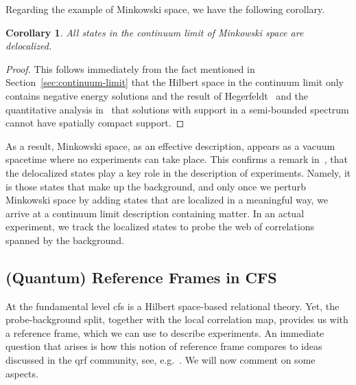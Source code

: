 \documentclass[reqno,11pt]{amsart}
\newtheorem{corollary}[definition]{Corollary}
\numberwithin{equation}{section}
\begin{document}
Regarding the example of Minkowski space, we have the following corollary. 
\begin{corollary}
      All states in the continuum limit of Minkowski space are delocalized. 
\end{corollary}
  
\begin{proof}
This follows immediately from the fact mentioned in Section~\ref{sec:continuum-limit} that the Hilbert space in the continuum limit only contains negative energy solutions and the result of Hegerfeldt~\cite{hegerfeldt1974remark} and the quantitative analysis in~\cite{finster2023incompatibility} that solutions with support in a semi-bounded spectrum cannot have spatially compact support.    
\end{proof}

As a result, Minkowski space, as an effective description, appears as a vacuum spacetime where no experiments can take place. 
This confirms a remark in~\cite{isidro2024gravitation}, that the delocalized states play a key role in the description of experiments.
Namely, it is those states that make up the background, and only once we perturb Minkowski space by adding states that are localized in a meaningful way, we arrive at
a continuum limit description containing matter.
In an actual experiment, we track the localized states to probe the web of correlations
spanned by the background.



% 
\subsection{(Quantum) Reference Frames in CFS}\label{subsec:reference frames}

At the fundamental level \ac{cfs} is a Hilbert space-based relational theory.
Yet, the probe-background split, together with the local correlation map,
provides us with a reference frame, which we can use to describe experiments.
An immediate question that arises is how this notion of reference frame compares to ideas discussed in the \ac{qrf} community,
see, e.g.~\cite{lake2023quantum,goeller2022frames, quantumFrameRelativity, bartlett2007reference, fewster2025quantum,Apadula2024quantumreference, ali2024quantum, Krumm2021quantumreference,Yang2020switchingquantum,carette2025operational,giacomini2019quantum}.
We will now comment on some aspects.
\end{document}

